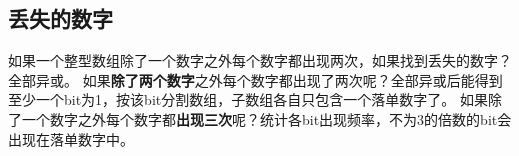 \subsection{丢失的数字}
如果一个整型数组除了一个数字之外每个数字都出现两次，如果找到丢失的数字？全部异或。
如果\textbf{除了两个数字}之外每个数字都出现了两次呢？全部异或后能得到至少一个bit为1，按该bit分割数组，子数组各自只包含一个落单数字了。
如果除了一个数字之外每个数字都\textbf{出现三次}呢？统计各bit出现频率，不为3的倍数的bit会出现在落单数字中。



















